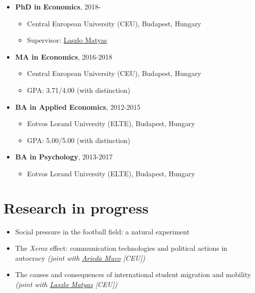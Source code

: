 \documentclass[a4paper,11pt]{article}
\begin{document}
\begin{itemize}
\item \textbf{PhD in Economics}, 2018-
\begin{itemize}
  \item Central European University (CEU), Budapest, Hungary
  \item Supervisor: \href{http://www.personal.ceu.hu/staff/matyas/}{Laszlo Matyas}
\end{itemize}

\item \textbf{MA in Economics}, 2016-2018
\begin{itemize}
  \item Central European University (CEU), Budapest, Hungary
  \item GPA: 3.71/4.00 (with distinction)
\end{itemize}

\item \textbf{BA in Applied Economics}, 2012-2015
\begin{itemize}
  \item Eotvos Lorand University (ELTE), Budapest, Hungary
  \item GPA: 5.00/5.00 (with distinction)
  \end{itemize}


\item \textbf{BA in Psychology}, 2013-2017
\begin{itemize}
  \item Eotvos Lorand University (ELTE), Budapest, Hungary
  \end{itemize}
\end{itemize}


\section*{Research in progress}

\begin{itemize}
  \item Social pressure in the football field: a natural experiment
  \item The \textit{Xerox} effect: communication technologies and political actions in autocracy \textit{(joint with \href{https://sites.google.com/view/ariedamuco/}{Arieda Muco} [CEU])}
  \item The causes and consequences of international student migration and mobility \textit{(joint with \href{http://www.personal.ceu.hu/staff/matyas/}{Laszlo Matyas} [CEU])}
\end{itemize}
\end{document}
